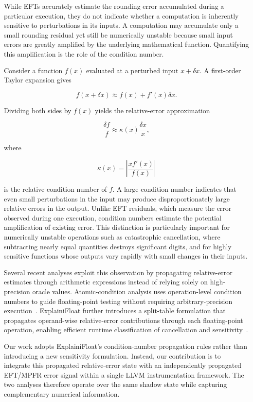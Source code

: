 While EFTs accurately estimate the rounding error accumulated during a particular execution, they do not indicate whether a computation is inherently sensitive to perturbations in its inputs. A computation may accumulate only a small rounding residual yet still be numerically unstable because small input errors are greatly amplified by the underlying mathematical function. Quantifying this amplification is the role of the condition number.

Consider a function $f(x)$ evaluated at a perturbed input $x+\delta x$. A first-order Taylor expansion gives

\[
f(x+\delta x)
    \approx
    f(x)+f'(x)\delta x.
\]

Dividing both sides by $f(x)$ yields the relative-error approximation

\[
\frac{\delta f}{f}
    \approx
    \kappa(x)
    \frac{\delta x}{x},
\]

where

\[
\kappa(x)=
\left|
\frac{x f'(x)}
     {f(x)}
\right|
\]

is the relative condition number of $f$. A large condition number indicates that even small perturbations in the input may produce disproportionately large relative errors in the output. Unlike EFT residuals, which measure the error observed during one execution, condition numbers estimate the potential amplification of existing error. This distinction is particularly important for numerically unstable operations such as catastrophic cancellation, where subtracting nearly equal quantities destroys significant digits, and for highly sensitive functions whose outputs vary rapidly with small changes in their inputs.

Several recent analyses exploit this observation by propagating relative-error estimates through arithmetic expressions instead of relying solely on high-precision oracle values. Atomic-condition analysis uses operation-level condition numbers to guide floating-point testing without requiring arbitrary-precision execution~\cite{atomicconditions}. ExplainiFloat further introduces a split-table formulation that propagates operand-wise relative-error contributions through each floating-point operation, enabling efficient runtime classification of cancellation and sensitivity~\cite{explainifloat}.

Our work adopts ExplainiFloat's condition-number propagation rules rather than introducing a new sensitivity formulation. Instead, our contribution is to integrate this propagated relative-error state with an independently propagated EFT/MPFR error signal within a single LLVM instrumentation framework. The two analyses therefore operate over the same shadow state while capturing complementary numerical information.

